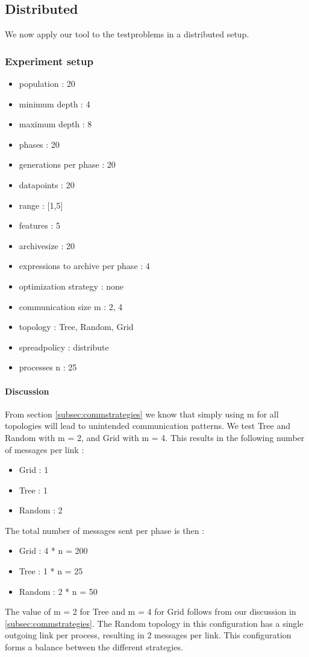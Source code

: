 \subsection{Distributed}
We now apply our tool to the testproblems in a distributed setup.

\subsubsection{Experiment setup}
\begin{itemize}
\item population : 20
\item minimum depth : 4
\item maximum depth : 8
\item phases : 20
\item generations per phase : 20
\item datapoints : 20
\item range : [1,5]
\item features : 5
\item archivesize : 20
\item expressions to archive per phase : 4
\item optimization strategy : none
\item communication size m : 2, 4
\item topology : Tree, Random, Grid
\item spreadpolicy : distribute
\item processes n : 25
\end{itemize}
\paragraph{Discussion}
From section \ref{subsec:commstrategies}
we know that simply using m for all topologies will lead to unintended communication patterns. We test Tree and Random with m = 2, and Grid with m = 4. This results in the following number of messages per link :
\begin{itemize}
\item Grid : 1
\item Tree : 1
\item Random : 2
\end{itemize}
The total number of messages sent per phase is then :
\begin{itemize}
\item Grid : 4 * n = 200
\item Tree : 1 * n = 25
\item Random : 2 * n = 50
\end{itemize}
The value of m = 2 for Tree and m = 4 for Grid follows from our discussion in \ref{subsec:commstrategies}. The Random topology in this configuration has a single outgoing link per process, resulting in 2 messages per link. This configuration forms a balance between the different strategies.

